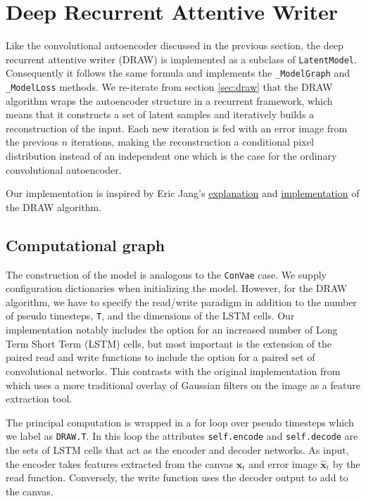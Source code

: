 
\section{Deep Recurrent Attentive Writer}\label{sec:draw_implement}

Like the convolutional autoencoder discussed in the previous section, the deep recurrent attentive writer (DRAW) is implemented as a subclass of \lstinline{LatentModel}. Consequently it follows the same formula and implements the  \lstinline{_ModelGraph} and \lstinline{_ModelLoss} methods. We re-iterate from section \ref{sec:draw} that the  DRAW algorithm wraps the autoencoder structure in a recurrent framework, which means that it constructs a set of latent samples and iteratively builds a reconstruction of the input. Each new iteration is fed with an error image from the previous $n$ iterations, making the reconstruction a conditional pixel distribution instead of an independent one which is the case for the ordinary convolutional autoencoder. 

Our implementation is inspired by Eric Jang's \href{https://blog.evjang.com/2016/06/understanding-and-implementing.html}{explanation} and \href{https://github.com/ericjang/draw}{implementation} of the DRAW algorithm.

\subsection{Computational graph}

The construction of the model is analogous to the \lstinline{ConVae} case. We supply configuration dictionaries when initializing the model. However, for the DRAW algorithm, we have to specify the read/write paradigm in addition to the number of pseudo timesteps, \lstinline{T}, and the dimensions of the LSTM cells.  Our implementation notably includes the option for an increased number of  Long Term Short Term (LSTM) cells, but most important is the extension of the paired read and write functions to include the option for a paired set of convolutional networks. This contrasts with the original implementation from \citet{Gregor2015} which uses a more traditional overlay of Gaussian filters on the image as a feature extraction tool. 

The principal computation is wrapped in a for loop over pseudo timesteps which we label as \lstinline{DRAW.T}. In this loop the attributes \lstinline{self.encode} and \lstinline{self.decode} are the sets of LSTM cells that act as the encoder and decoder networks. As input, the encoder takes features extracted from the canvas $\boldsymbol{x}_t$ and error image $\boldsymbol{\hat{x}}_t$ by the read function. Conversely, the write function uses the decoder output to add to the canvas. 

